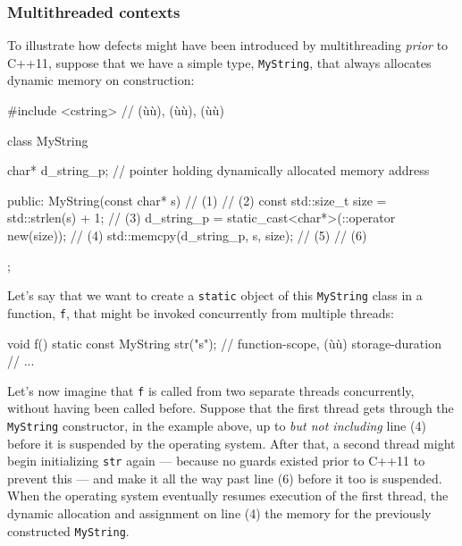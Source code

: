 \subsubsection[Multithreaded contexts]{Multithreaded contexts}\label{multithreaded-contexts}

To illustrate how defects might have been introduced by multithreading
\emph{prior} to C++11, suppose that we have a simple type,
\lstinline!MyString!, that always allocates dynamic memory on construction:

\begin{emcppslisting}[emcppsbatch=e4]
#include <cstring>  // (ù{}ù), (ù{}ù), (ù{}ù)

class MyString
{
    char* d_string_p;  // pointer holding dynamically allocated memory address

public:
    MyString(const char* s)                                     // (1)
    {                                                           // (2)
        const std::size_t size = std::strlen(s) + 1;            // (3)
        d_string_p = static_cast<char*>(::operator new(size));  // (4)
        std::memcpy(d_string_p, s, size);                       // (5)
    }                                                           // (6)
};
\end{emcppslisting}

\noindent Let's say that we want to create a \lstinline!static! object of this
\lstinline!MyString! class in a function, \lstinline!f!, that might be invoked
concurrently from multiple threads:

\begin{emcppslisting}[emcppsbatch=e4]
void f()
{
    static const MyString str("s");  // function-scope, (ù{}ù) storage-duration
    // ...
}
\end{emcppslisting}

\noindent Let's now imagine that \lstinline!f! is called from
two separate threads concurrently, without having been called before. Suppose that the first thread gets
through the \lstinline!MyString! constructor, in the example above, up to
\emph{but not including} line (4) before it is suspended by the
operating system. After that, a second thread might begin initializing \lstinline!str! again --- because
no guards existed prior to C++11 to prevent this --- and make it all the way past line (6) before it too
is suspended. When the operating system eventually resumes execution of
the first thread, the dynamic allocation and assignment on line (4)
 the memory for the previously constructed
\lstinline!MyString!. 

